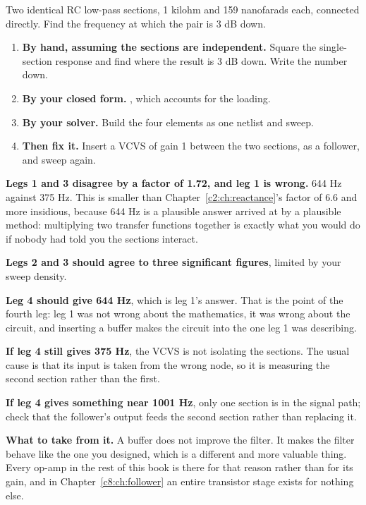 \label{c3:ex:8}
Two identical RC low-pass sections, 1 kilohm and 159 nanofarads each, connected directly. Find the frequency at which the pair is 3 dB down.

\begin{enumerate}
  \item \textbf{By hand, assuming the sections are independent.} Square the single-section response and find where the result is 3 dB down. Write the number down.
  \item \textbf{By your closed form.} , which accounts for the loading.
  \item \textbf{By your solver.} Build the four elements as one netlist and sweep.
  \item \textbf{Then fix it.} Insert a VCVS of gain 1 between the two sections, as a follower, and sweep again.
\end{enumerate}

\textbf{Legs 1 and 3 disagree by a factor of 1.72, and leg 1 is wrong.} 644 Hz against 375 Hz. This is smaller than Chapter~\ref{c2:ch:reactance}'s factor of 6.6 and more insidious, because 644 Hz is a plausible answer arrived at by a plausible method: multiplying two transfer functions together is exactly what you would do if nobody had told you the sections interact.

\textbf{Legs 2 and 3 should agree to three significant figures}, limited by your sweep density.

\textbf{Leg 4 should give 644 Hz}, which is leg 1's answer. That is the point of the fourth leg: leg 1 was not wrong about the mathematics, it was wrong about the circuit, and inserting a buffer makes the circuit into the one leg 1 was describing.

\textbf{If leg 4 still gives 375 Hz}, the VCVS is not isolating the sections. The usual cause is that its input is taken from the wrong node, so it is measuring the second section rather than the first.

\textbf{If leg 4 gives something near 1001 Hz}, only one section is in the signal path; check that the follower's output feeds the second section rather than replacing it.

\textbf{What to take from it.} A buffer does not improve the filter. It makes the filter behave like the one you designed, which is a different and more valuable thing. Every op-amp in the rest of this book is there for that reason rather than for its gain, and in Chapter~\ref{c8:ch:follower} an entire transistor stage exists for nothing else.
